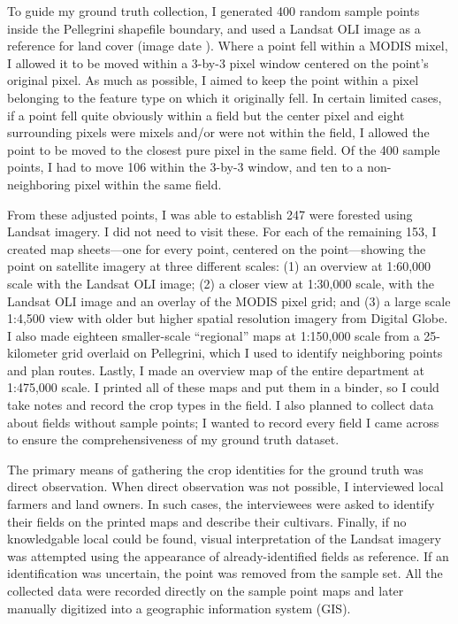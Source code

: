 To guide my ground truth collection, I generated 400 random sample points inside the Pellegrini shapefile boundary, and used a Landsat OLI image as a reference for land cover (image date ). Where a point fell within a MODIS mixel, I allowed it to be moved within a 3-by-3 pixel window centered on the point's original pixel. As much as possible, I aimed to keep the point within a pixel belonging to the feature type on which it originally fell. In certain limited cases, if a point fell quite obviously within a field but the center pixel and eight surrounding pixels were mixels and/or were not within the field, I allowed the point to be moved to the closest pure pixel in the same field. Of the 400 sample points, I had to move 106 within the 3-by-3 window, and ten to a non-neighboring pixel within the same field.

From these adjusted points, I was able to establish 247 were forested using Landsat imagery. I did not need to visit these. For each of the remaining 153, I created map sheets---one for every point, centered on the point---showing the point on satellite imagery at three different scales: (1) an overview at 1:60,000 scale with the  Landsat OLI image; (2) a closer view at 1:30,000 scale, with the Landsat OLI image and an overlay of the MODIS pixel grid; and (3) a large scale 1:4,500 view with older but higher spatial resolution imagery from Digital Globe. I also made eighteen smaller-scale ``regional'' maps at 1:150,000 scale from a 25-kilometer grid overlaid on Pellegrini, which I used to identify neighboring points and plan routes. Lastly, I made an overview map of the entire department at 1:475,000 scale. I printed all of these maps and put them in a binder, so I could take notes and record the crop types in the field. I also planned to collect data about fields without sample points; I wanted to record every field I came across to ensure the comprehensiveness of my ground truth dataset.
 
The primary means of gathering the crop identities for the ground truth was direct observation. When direct observation was not possible, I interviewed local farmers and land owners. In such cases, the interviewees were asked to identify their fields on the printed maps and describe their cultivars. Finally, if no knowledgable local could be found, visual interpretation of the Landsat imagery was attempted using the appearance of already-identified fields as reference. If an identification was uncertain, the point was removed from the sample set. All the collected data were recorded directly on the sample point maps and later manually digitized into a geographic information system (GIS).

